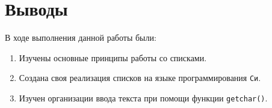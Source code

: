 \section{Выводы}

В ходе выполнения данной работы были:

\begin{enumerate}
  \item Изучены основные принципы работы со списками.
  \item Создана своя реализация списков на языке программирования \texttt{Си}.
  \item Изучен организации ввода текста при помощи функции \texttt{getchar()}.
\end{enumerate}
